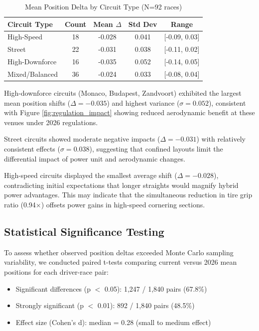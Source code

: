 \documentclass[conference]{IEEEtran}
\begin{document}
\begin{table}[h]
\centering
\caption{Mean Position Delta by Circuit Type (N=92 races)}
\begin{tabular}{lcccc}
\toprule
\textbf{Circuit Type} & \textbf{Count} & \textbf{Mean $\Delta$} & \textbf{Std Dev} & \textbf{Range} \\
\midrule
High-Speed & 18 & -0.028 & 0.041 & [-0.09, 0.03] \\
Street & 22 & -0.031 & 0.038 & [-0.11, 0.02] \\
High-Downforce & 16 & -0.035 & 0.052 & [-0.14, 0.05] \\
Mixed/Balanced & 36 & -0.024 & 0.033 & [-0.08, 0.04] \\
\bottomrule
\end{tabular}
\label{tab:circuit_impact}
\end{table}

High-downforce circuits (Monaco, Budapest, Zandvoort) exhibited the largest mean position shifts ($\Delta = -0.035$) and highest variance ($\sigma = 0.052$), consistent with Figure \ref{fig:regulation_impact} showing reduced aerodynamic benefit at these venues under 2026 regulations.

Street circuits showed moderate negative impacts ($\Delta = -0.031$) with relatively consistent effects ($\sigma = 0.038$), suggesting that confined layouts limit the differential impact of power unit and aerodynamic changes.

High-speed circuits displayed the smallest average shift ($\Delta = -0.028$), contradicting initial expectations that longer straights would magnify hybrid power advantages. This may indicate that the simultaneous reduction in tire grip ratio (0.94$\times$) offsets power gains in high-speed cornering sections.

\subsection{Statistical Significance Testing}

To assess whether observed position deltas exceeded Monte Carlo sampling variability, we conducted paired t-tests comparing current versus 2026 mean positions for each driver-race pair:

\begin{itemize}
    \item Significant differences (p $<$ 0.05): 1,247 / 1,840 pairs (67.8\%)
    \item Strongly significant (p $<$ 0.01): 892 / 1,840 pairs (48.5\%)
    \item Effect size (Cohen's d): median = 0.28 (small to medium effect)
\end{itemize}
\end{document}
